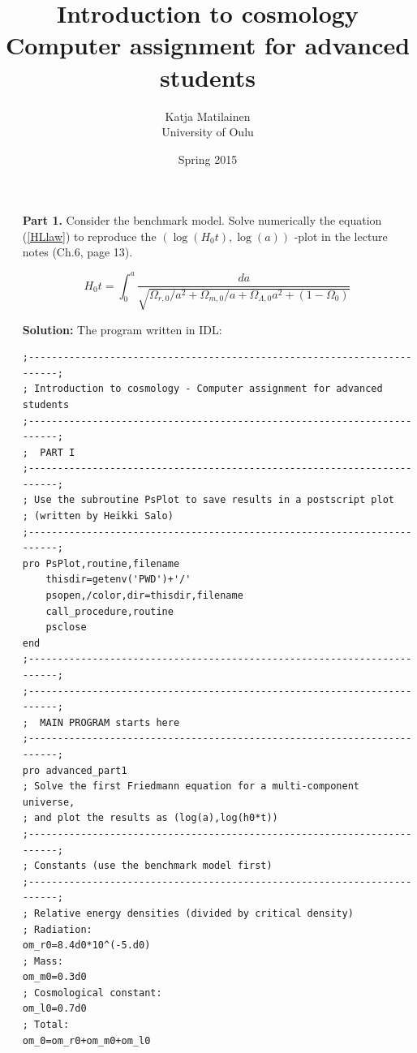\documentclass[a4paper,12pt]{article}
\author{Katja Matilainen \\ University of Oulu}
\title{Introduction to cosmology \\ Computer assignment for advanced students}
\date{Spring 2015}
\begin{document}
\begin{tiny}
\maketitle
\end{tiny}

\vspace{0.5cm}

\begin{itemize}

\item[\textbf{Part 1.}] Consider the benchmark model. Solve numerically the equation (\ref{HLlaw}) to reproduce the $(\log(H_0 t),\log(a))$ -plot in the lecture notes (Ch.6, page 13).

\begin{equation}\label{HLlaw}
H_0 t = \int_0^a \frac{da}{\sqrt{\Omega_{r,0}/a^2+\Omega_{m,0}/a+\Omega_{\Lambda,0} a^2 +(1-\Omega_0)}}
\end{equation}

\vspace{0.5cm}

\textbf{Solution:}
The program written in IDL:
\begin{scriptsize}
\begin{verbatim}
;------------------------------------------------------------------------;
; Introduction to cosmology - Computer assignment for advanced students
;------------------------------------------------------------------------;
;  PART I
;------------------------------------------------------------------------;
; Use the subroutine PsPlot to save results in a postscript plot 
; (written by Heikki Salo)
;------------------------------------------------------------------------;
pro PsPlot,routine,filename
	thisdir=getenv('PWD')+'/'
	psopen,/color,dir=thisdir,filename
	call_procedure,routine
	psclose		
end
;------------------------------------------------------------------------;
;------------------------------------------------------------------------;
;  MAIN PROGRAM starts here
;------------------------------------------------------------------------;
pro advanced_part1
; Solve the first Friedmann equation for a multi-component universe,
; and plot the results as (log(a),log(h0*t))
;------------------------------------------------------------------------;
; Constants (use the benchmark model first)
;------------------------------------------------------------------------;
; Relative energy densities (divided by critical density)
; Radiation:
om_r0=8.4d0*10^(-5.d0)
; Mass:
om_m0=0.3d0
; Cosmological constant:
om_l0=0.7d0
; Total:
om_0=om_r0+om_m0+om_l0


\end{verbatim}
\end{scriptsize}
\end{itemize}
\end{document}
